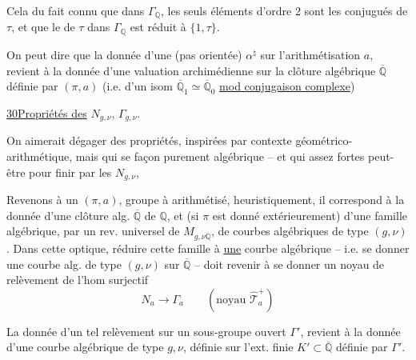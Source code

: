 

Cela  du fait connu que dans $\Gamma_{\mathbb Q}$, les seuls éléments d'ordre 2 sont les conjugués de $\tau$, et que le  de $\tau$ dans $\Gamma_{\mathbb Q}$ est réduit à $\{1,\tau\}$.

On peut dire que la donnée d'une  (pas orientée) $\alpha^{\natural}$ sur l'arithmétisation $a$, revient à la donnée d'une  valuation archimédienne sur la clôture algébrique $\overline{\mathbb Q}$  définie par $(\pi,a)$ (i.e. d'un isom $\overline{\mathbb Q}_1\simeq\overline{\mathbb Q}_0$ \uline{mod conjugaison complexe})




\uline{30}\quad \uline{Propriétés des} $N_{g,\nu}$, $\Gamma_{g,\nu}$.

On aimerait dégager des propriétés, inspirées par  contexte géométrico-arithmétique, mais qui  se   façon purement algébrique -- et qui  assez fortes peut-être pour finir par  les $N_{g,\nu}$, 

Revenons à un $(\pi,a)$, groupe à  arithmétisé, heuristiquement, il correspond à la donnée d'une clôture alg. $\overline{\mathbb Q}$ de $\mathbb Q$, et (si $\pi$ est donné extérieurement) d'une famille algébrique,  par un rev. universel  de $M_{g,\nu\overline{\mathbb Q}}$, de courbes algébriques de type $(g,\nu)$. Dans cette optique, réduire cette famille à \uline{une} courbe algébrique -- i.e. se donner une courbe alg. de type $(g,\nu)$ sur $\overline{\mathbb Q}$ -- doit revenir à se donner un noyau de relèvement de l'hom surjectif
\[
 N_a\longrightarrow\Gamma_a
 \qquad (\text{noyau }\widehat{\mathcal T}_a^+)
 \tag{1}
\]


La donnée d'un tel relèvement sur un sous-groupe ouvert $\Gamma'$, revient à la donnée d'une courbe algébrique de type $g,\nu$, définie sur l'ext. finie $K'\subset\overline{\mathbb Q}$ définie par $\Gamma'$.

